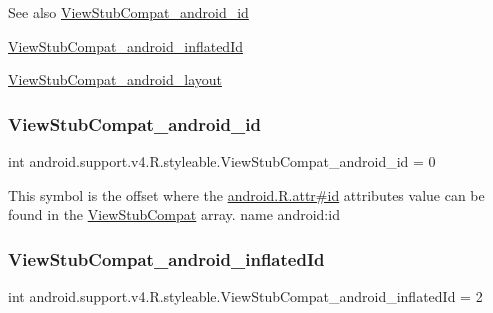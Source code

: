\begin{DoxySeeAlso}{See also}
\hyperlink{classandroid_1_1support_1_1v4_1_1R_1_1styleable_ada9d7e1b152db1b18492689abaa58a30}{View\+Stub\+Compat\+\_\+android\+\_\+id} 

\hyperlink{classandroid_1_1support_1_1v4_1_1R_1_1styleable_a99ce544fb3cb0bda464169d5f26b9806}{View\+Stub\+Compat\+\_\+android\+\_\+inflated\+Id} 

\hyperlink{classandroid_1_1support_1_1v4_1_1R_1_1styleable_af1b362398fc2f79e6599ea6bf0d712cc}{View\+Stub\+Compat\+\_\+android\+\_\+layout} 
\end{DoxySeeAlso}
\mbox{\label{classandroid_1_1support_1_1v4_1_1R_1_1styleable_ada9d7e1b152db1b18492689abaa58a30}} 
\subsubsection{\texorpdfstring{View\+Stub\+Compat\+\_\+android\+\_\+id}{ViewStubCompat\_android\_id}}
{\footnotesize\ttfamily int android.\+support.\+v4.\+R.\+styleable.\+View\+Stub\+Compat\+\_\+android\+\_\+id = 0\hspace{0.3cm}{\ttfamily [static]}}

This symbol is the offset where the \hyperlink{}{android.\+R.\+attr\#id} attribute\textquotesingle{}s value can be found in the \hyperlink{classandroid_1_1support_1_1v4_1_1R_1_1styleable_a1cd2d3a360da85e50068df345a364a59}{View\+Stub\+Compat} array.  name android\+:id \mbox{\label{classandroid_1_1support_1_1v4_1_1R_1_1styleable_a99ce544fb3cb0bda464169d5f26b9806}} 
\subsubsection{\texorpdfstring{View\+Stub\+Compat\+\_\+android\+\_\+inflated\+Id}{ViewStubCompat\_android\_inflatedId}}
{\footnotesize\ttfamily int android.\+support.\+v4.\+R.\+styleable.\+View\+Stub\+Compat\+\_\+android\+\_\+inflated\+Id = 2\hspace{0.3cm}{\ttfamily [static]}}

